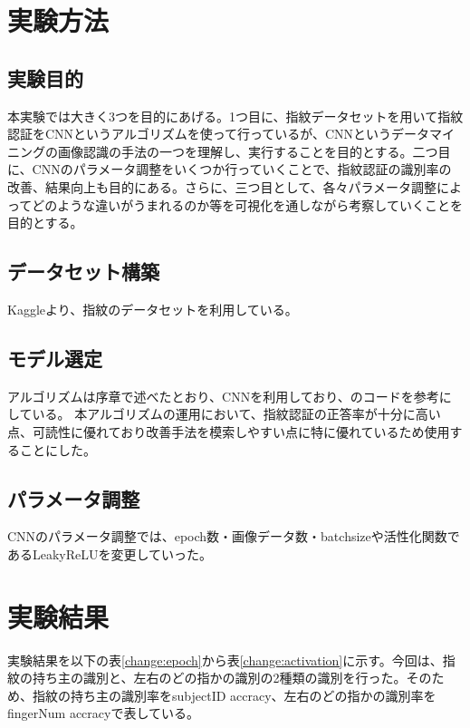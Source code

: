 \documentclass[a4paper, 11pt, titlepage]{jsarticle}
\begin{document}
\section{実験方法}


\subsection{実験目的}
本実験では大きく3つを目的にあげる。1つ目に、指紋データセットを用いて指紋認証をCNNというアルゴリズムを使って行っているが、CNNというデータマイニングの画像認識の手法の一つを理解し、実行することを目的とする。二つ目に、CNNのパラメータ調整をいくつか行っていくことで、指紋認証の識別率の改善、結果向上も目的にある。さらに、三つ目として、各々パラメータ調整によってどのような違いがうまれるのか等を可視化を通しながら考察していくことを目的とする。


\subsection{データセット構築}
Kaggleより、指紋のデータセット\cite{dataset}を利用している。

\subsection{モデル選定}
アルゴリズムは序章で述べたとおり、CNNを利用しており、\cite{algorithm}のコードを参考にしている。
本アルゴリズムの運用において、指紋認証の正答率が十分に高い点、可読性に優れており改善手法を模索しやすい点に特に優れているため使用することにした。

\subsection{パラメータ調整}
CNNのパラメータ調整では、epoch数・画像データ数・batchsizeや活性化関数であるLeakyReLUを変更していった。


\section{実験結果}

実験結果を以下の表\ref{change:epoch}から表\ref{change:activation}に示す。今回は、指紋の持ち主の識別と、左右のどの指かの識別の2種類の識別を行った。そのため、指紋の持ち主の識別率をsubjectID accracy、左右のどの指かの識別率をfingerNum accracyで表している。
\end{document}
